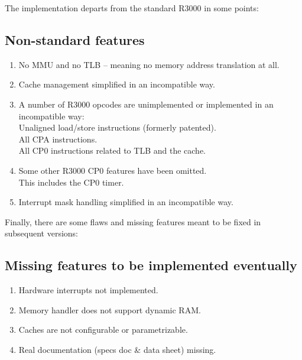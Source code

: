 The implementation departs from the standard R3000 in some points:

\begin{framed}
\subsection{Non-standard features}
\begin{enumerate}
    \item No MMU and no TLB -- meaning no memory address translation at all.
    \item Cache management simplified in an incompatible way.
    \item A number of R3000 opcodes are unimplemented or implemented in an 
          incompatible way:\\
        Unaligned load/store instructions (formerly patented).\\
        All CPA instructions.\\
        All CP0 instructions related to TLB and the cache.
    \item Some other R3000 CP0 features have been omitted.\\
        This includes the CP0 timer.
    \item Interrupt mask handling simplified in an incompatible way.
\end{enumerate}
\end{framed}

Finally, there are some flaws and missing features meant to be fixed in 
subsequent versions:

\begin{framed}
\subsection{Missing features to be implemented eventually}
\begin{enumerate}
    \item Hardware interrupts not implemented.
    \item Memory handler does not support dynamic RAM.
    \item Caches are not configurable or parametrizable.
    \item Real documentation (specs doc \& data sheet) missing.
\end{enumerate}
\end{framed}

    

